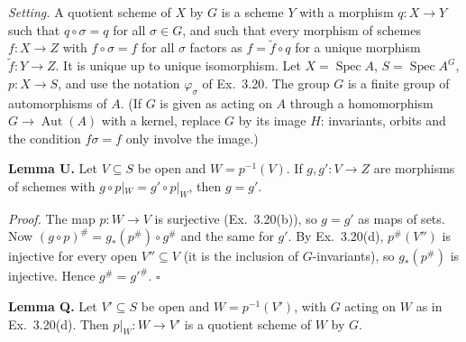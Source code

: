 \documentclass[11pt]{article}
\begin{document}
\pf
\emph{Setting.} A quotient scheme of $X$ by $G$ is a scheme $Y$ with a morphism $q:X\to Y$ such that $q\circ\sigma=q$ for all $\sigma\in G$, and such that every morphism of schemes $f:X\to Z$ with $f\circ\sigma=f$ for all $\sigma$ factors as $f=\tilde f\circ q$ for a unique morphism $\tilde f:Y\to Z$. It is unique up to unique isomorphism. Let $X=\operatorname{Spec}A$, $S=\operatorname{Spec}A^G$, $p:X\to S$, and use the notation $\varphi_\sigma$ of Ex.~3.20. The group $G$ is a finite group of automorphisms of $A$. (If $G$ is given as acting on $A$ through a homomorphism $G\to\operatorname{Aut}(A)$ with a kernel, replace $G$ by its image $H$: invariants, orbits and the condition $f\sigma=f$ only involve the image.)

\textbf{Lemma U.} Let $V\subseteq S$ be open and $W=p^{-1}(V)$. If $g,g':V\to Z$ are morphisms of schemes with $g\circ p|_W=g'\circ p|_W$, then $g=g'$.

\emph{Proof.} The map $p:W\to V$ is surjective (Ex.~3.20(b)), so $g=g'$ as maps of sets. Now $(g\circ p)^\#=g_*(p^\#)\circ g^\#$ and the same for $g'$. By Ex.~3.20(d), $p^\#(V'')$ is injective for every open $V''\subseteq V$ (it is the inclusion of $G$-invariants), so $g_*(p^\#)$ is injective. Hence $g^\#=g'^\#$. $\square$

\textbf{Lemma Q.} Let $V'\subseteq S$ be open and $W=p^{-1}(V')$, with $G$ acting on $W$ as in Ex.~3.20(d). Then $p|_W:W\to V'$ is a quotient scheme of $W$ by $G$.
\end{document}
